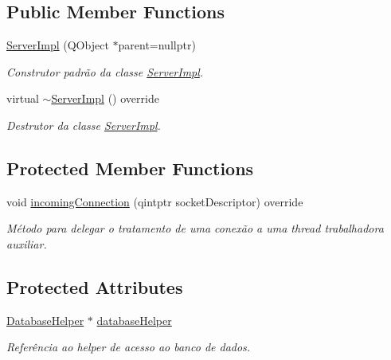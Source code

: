 \subsection*{Public Member Functions}
\begin{DoxyCompactItemize}
\item 
\hyperlink{classServerImpl_a0c81e2a5af6cea9a1ff0445008c22e84}{Server\+Impl} (Q\+Object $\ast$parent=nullptr)
\begin{DoxyCompactList}\small\item\em Construtor padrão da classe \hyperlink{classServerImpl}{Server\+Impl}. \end{DoxyCompactList}\item 
virtual \hyperlink{classServerImpl_aef0bf73c21130de67a3f262dff915cd2}{$\sim$\+Server\+Impl} () override
\begin{DoxyCompactList}\small\item\em Destrutor da classe \hyperlink{classServerImpl}{Server\+Impl}. \end{DoxyCompactList}\end{DoxyCompactItemize}
\subsection*{Protected Member Functions}
\begin{DoxyCompactItemize}
\item 
void \hyperlink{classServerImpl_a54dda38486e9964432b501f7da00ed97}{incoming\+Connection} (qintptr socket\+Descriptor) override
\begin{DoxyCompactList}\small\item\em Método para delegar o tratamento de uma conexão a uma thread trabalhadora auxiliar. \end{DoxyCompactList}\end{DoxyCompactItemize}
\subsection*{Protected Attributes}
\begin{DoxyCompactItemize}
\item 
\hyperlink{classDatabaseHelper}{Database\+Helper} $\ast$ \hyperlink{classServerImpl_af78b294c790b327b0023f295c5d7508c}{database\+Helper}\hypertarget{classServerImpl_af78b294c790b327b0023f295c5d7508c}{}\label{classServerImpl_af78b294c790b327b0023f295c5d7508c}

\begin{DoxyCompactList}\small\item\em Referência ao helper de acesso ao banco de dados. \end{DoxyCompactList}\end{DoxyCompactItemize}


